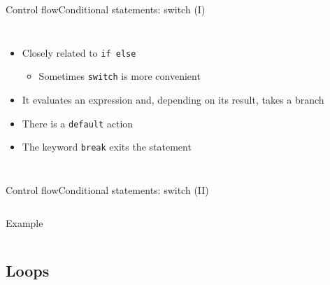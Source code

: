 \documentclass[10pt,compress]{beamer} %
\begin{document}
\begin{frame}{Control flow}{Conditional statements: switch (I)}
	\vspace{-0.2cm}
    \begin{columns}
		\begin{itemize}
		\item Closely related to \texttt{if else}
			\begin{itemize}
			\item Sometimes \texttt{switch} is more convenient
			\end{itemize}
		\item It evaluates an expression and, depending on its result, takes a branch
		\item There is a \texttt{default} action
		\item The keyword \texttt{break} exits the statement
	    \end{itemize}
		\begin{block}{}
		\vspace{-0.2cm}
		
		\vspace{-0.2cm}
		\end{block}
	\end{columns}
\end{frame}

\begin{frame}{Control flow}{Conditional statements: switch (II)}
	\vspace{-0.4cm}
	\begin{columns}
	\column{0.7\textwidth}
	\begin{block}{Example}
		\vspace{-0.25cm}
		
		\vspace{-0.2cm}
	\end{block}
	\end{columns}
\end{frame}

\subsection{Loops}
\end{document}
